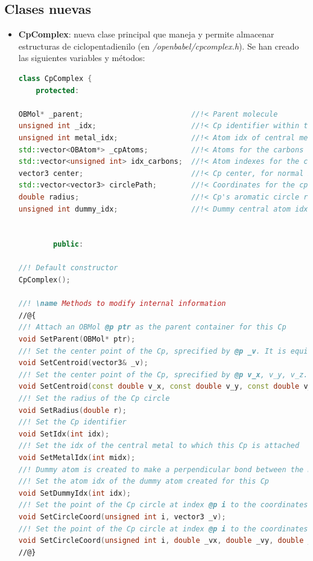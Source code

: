 




\subsection{Clases nuevas}
\begin{itemize}
    \item \textbf{CpComplex}: nueva clase principal que maneja y permite almacenar estructuras de ciclopentadienilo (en \textit{/openbabel/cpcomplex.h}). Se han creado las siguientes variables y métodos:
    \begin{lstlisting}[language=C++]
class CpComplex {
	protected:
  
OBMol* _parent;                         //!< Parent molecule
unsigned int _idx;                      //!< Cp identifier within the molecule
unsigned int metal_idx;                 //!< Atom idx of central metal
std::vector<OBAtom*> _cpAtoms;          //!< Atoms for the carbons of the Cp structure
std::vector<unsigned int> idx_carbons;  //!< Atom indexes for the carbons of the Cp structure
vector3 center;                         //!< Cp center, for normal bond connection with metal atom, and aromatic circle position
std::vector<vector3> circlePath;        //!< Coordinates for the cp circle (needed to achieve a perspective circunference)
double radius;                          //!< Cp's aromatic circle radius
unsigned int dummy_idx;                 //!< Dummy central atom idx


        public:

//! Default constructor 
CpComplex();

//! \name Methods to modify internal information
//@{
//! Attach an OBMol @p ptr as the parent container for this Cp
void SetParent(OBMol* ptr);
//! Set the center point of the Cp, sprecified by @p _v. It is equidistant to every carbon in th Cp, as they are disposed in a regular polygon
void SetCentroid(vector3& _v);
//! Set the center point of the Cp, sprecified by @p v_x, v_y, v_z. It is equidistant to every carbon in th Cp, as they are disposed in a regular polygon
void SetCentroid(const double v_x, const double v_y, const double v_z);
//! Set the radius of the Cp circle
void SetRadius(double r);
//! Set the Cp identifier
void SetIdx(int idx);
//! Set the idx of the central metal to which this Cp is attached
void SetMetalIdx(int midx);
//! Dummy atom is created to make a perpendicular bond between the metal and the Cp drawing
//! Set the atom idx of the dummy atom created for this Cp 
void SetDummyIdx(int idx);
//! Set the point of the Cp circle at index @p i to the coordinates specified by @p _v
void SetCircleCoord(unsigned int i, vector3 _v);
//! Set the point of the Cp circle at index @p i to the coordinates specified by @p _vx, _vy, _vz
void SetCircleCoord(unsigned int i, double _vx, double _vy, double _vz = 0.0);
//@}



\end{lstlisting}
\end{itemize}
